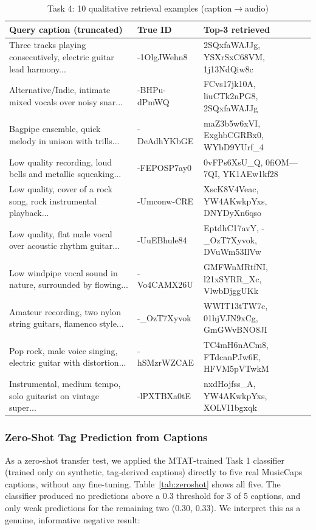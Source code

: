 \documentclass[conference]{IEEEtran}
\begin{document}
\begin{table}[h]
\centering
\caption{Task 4: 10 qualitative retrieval examples (caption$\to$audio)}
\label{tab:qualitative}
\tiny
\begin{tabular}{p{3.7cm}p{1.1cm}p{2.6cm}}
\toprule
Query caption (truncated) & True ID & Top-3 retrieved \\
\midrule
Three tracks playing consecutively, electric guitar lead harmony... & -1OlgJWehn8 & 2SQxfaWAJJg, YSXrSxC68VM, 1j13NdQiw8c \\
Alternative/Indie, intimate mixed vocals over noisy snar... & -BHPu-dPmWQ & FCvs17jk10A, liuCTk2nPG8, 2SQxfaWAJJg \\
Bagpipe ensemble, quick melody in unison with trills... & -DeAdhYKbGE & maZ3b5w6xVI, ExghbCGRBx0, WYbD9YUrf\_4 \\
Low quality recording, loud bells and metallic squeaking... & -FEPOSP7ay0 & 0vFPs6XsU\_Q, 0fiOM---7QI, YK1AEw1kf28 \\
Low quality, cover of a rock song, rock instrumental playback... & -Umconw-CRE & XscK8V4Veac, YW4AKwkpYxs, DNYDyXn6qso \\
Low quality, flat male vocal over acoustic rhythm guitar... & -UuEBhule84 & EptdhC17avY, -\_OzT7Xyvok, DVuWm53IlVw \\
Low windpipe vocal sound in nature, surrounded by flowing... & -Vo4CAMX26U & GMFWnMRtfNI, l21xSYRR\_Xc, VlwbDjggUKk \\
Amateur recording, two nylon string guitars, flamenco style... & -\_OzT7Xyvok & WWIT13tTW7c, 01hjVJN9xCg, GmGWvBNO8JI \\
Pop rock, male voice singing, electric guitar with distortion... & -hSMzrWZCAE & TC4mH6nACm8, FTdcanPJw6E, HFVM5pVTwkM \\
Instrumental, medium tempo, solo guitarist on vintage super... & -lPXTBXa0tE & nxdHojfss\_A, YW4AKwkpYxs, XOLVI1bgxqk \\
\bottomrule
\end{tabular}
\end{table}

\subsubsection{Zero-Shot Tag Prediction from Captions}
As a zero-shot transfer test, we applied the MTAT-trained Task 1
classifier (trained only on synthetic, tag-derived captions) directly
to five real MusicCaps captions, without any fine-tuning.
Table~\ref{tab:zeroshot} shows all five. The classifier produced no
predictions above a 0.3 threshold for 3 of 5 captions, and only weak
predictions for the remaining two (0.30, 0.33). We interpret this as a
genuine, informative negative result:
\end{document}
